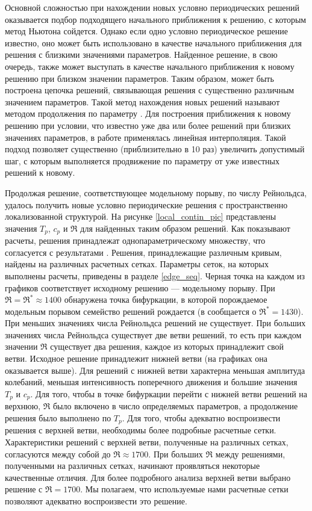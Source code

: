 Основной сложностью при нахождении новых условно периодических решений оказывается подбор подходящего начального приближения к решению, с которым метод Ньютона сойдется. Однако если одно условно периодическое решение известно, оно может быть использовано в качестве начального приближения для решения с близкими значениями параметров. Найденное решение, в свою очередь, также может выступать в качестве начального приближения к новому решению при близком значении параметров. Таким образом, может быть построена цепочка решений, связывающая решения с существенно различным значением параметров. Такой метод нахождения новых решений называют методом продолжения по параметру \cite{Viswanath2007, Dijkstra2014}. Для построения приближения к новому решению при условии, что известно уже два или более решений при близких значениях параметров, в работе применялась линейная интерполяция. Такой подход позволяет существенно (приблизительно в 10 раз) увеличить допустимый шаг, с которым выполняется продвижение по параметру от уже известных решений к новому. 

Продолжая решение, соответствующее модельному порыву, по числу Рейнольдса, удалось получить новые условно периодические решения с пространственно локализованной структурой. На рисунке \ref{local_contin_pic} представлены значения $T_p$, $c_p$ и $\Re$ для найденных таким образом решений. Как показывают расчеты, решения принадлежат однопараметрическому множеству, что согласуется с результатами \cite{Avila2013}. Решения, принадлежащие различным кривым, найдены на различных расчетных сетках. Параметры сеток, на которых выполнены расчеты, приведены в разделе \ref{edge_seq}. Черная точка на каждом из графиков соответствует исходному решению --- модельному порыву. При $\Re = \Re^* \approx 1400$ обнаружена точка бифуркации, в которой порождаемое модельным порывом семейство решений рождается (в \cite{Avila2013} сообщается о $\Re^* = 1430$). При меньших значениях числа Рейнольдса решений не существует. При больших значениях числа Рейнольдса существует две ветви решений, то есть при каждом значении $\Re$ существует два решения, каждое из которых принадлежит свой ветви. Исходное решение принадлежит нижней ветви (на графиках она оказывается выше). Для решений с нижней ветви характерна меньшая амплитуда колебаний, меньшая интенсивность поперечного движения и большие значения $T_p$ и $c_p$. Для того, чтобы в точке бифуркации перейти с нижней ветви решений на верхнюю, $\Re$ было включено в число определяемых параметров, а продолжение решения было выполнено по $T_p$. Для того, чтобы адекватно воспроизвести решения с верхней ветви, необходимы более подробные расчетные сетки. Характеристики решений с верхней ветви, полученные на различных сетках, согласуются между собой до $\Re \approx 1700$. При больших $\Re$ между решениями, полученными на различных сетках, начинают проявляться некоторые качественные отличия. Для более подробного анализа верхней ветви выбрано решение с $\Re = 1700$. Мы полагаем, что используемые нами расчетные сетки позволяют адекватно воспроизвести это решение. 



